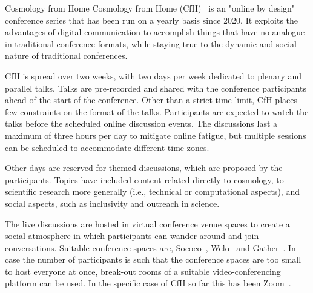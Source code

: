 \documentclass[../SustainableHEP.tex]{subfiles}
\begin{document}

\begin{casestudy}{Cosmology from Home}%
Cosmology from Home (CfH)~\cite{CfHwebsite} is an "online by design" conference series that has been run on a yearly basis since 2020. It exploits the advantages of digital communication to accomplish things that have no analogue in traditional conference formats, while staying true to the dynamic and social nature of traditional conferences.



CfH is spread over two weeks, with two days per week dedicated to plenary and parallel talks. Talks are pre-recorded and shared with the conference participants ahead of the start of the conference. Other than a strict time limit, CfH places few constraints on the format of the talks. Participants are expected to watch the talks before the scheduled online discussion events. The discussions last a maximum of three hours per day to mitigate online fatigue, but multiple sessions can be scheduled to accommodate different time zones.

Other days are reserved for themed discussions, which are proposed by the participants.  Topics have included content related directly to cosmology, to scientific research more generally (i.e., technical or computational aspects), and social aspects, such as inclusivity and outreach in science.

The live discussions are hosted in virtual conference venue spaces to create a social atmosphere in which participants can wander around and join conversations. Suitable conference spaces are, \eg Sococo~\cite{Sococo}, Welo~\cite{Welo} and Gather~\cite{Gather}. In case the number of participants is such that the conference spaces are too small to host everyone at once, break-out rooms of a suitable video-conferencing platform can be used. In the specific case of CfH so far this has been Zoom~\cite{Zoom}.


\end{casestudy}
\end{document}
